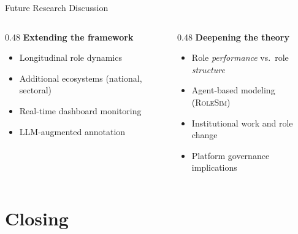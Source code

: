 \documentclass[aspectratio=169]{beamer}
\newcommand{\RoleSim}{\textsc{RoleSim}}
\newcommand{\secmark}[1]{\hfill{\scriptsize\color{gray}#1}}
\begin{document}
\begin{frame}{Future Research}
\secmark{Discussion}
\begin{columns}[T]
\begin{column}{0.48\textwidth}
    \textbf{Extending the framework}
    \begin{itemize}
        \item Longitudinal role dynamics
        \item Additional ecosystems (national, sectoral)
        \item Real-time dashboard monitoring
        \item LLM-augmented annotation
    \end{itemize}
\end{column}
\begin{column}{0.48\textwidth}
    \textbf{Deepening the theory}
    \begin{itemize}
        \item Role \emph{performance} vs.\ role \emph{structure}
        \item Agent-based modeling (\RoleSim)
        \item Institutional work and role change
        \item Platform governance implications
    \end{itemize}
\end{column}
\end{columns}
\vspace{0.8em}
\centering
{}
\end{frame}

\section{Closing}
\end{document}
